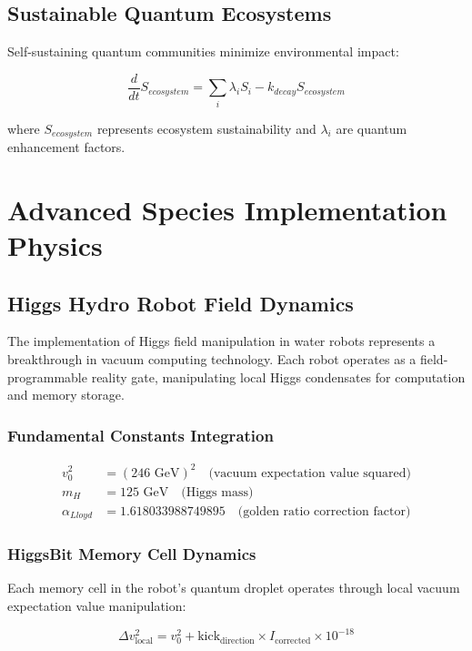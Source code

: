 \documentclass[11pt,a4paper]{article}
\begin{document}
\subsection{Sustainable Quantum Ecosystems}

Self-sustaining quantum communities minimize environmental impact:

\begin{equation}
\frac{d}{dt}S_{ecosystem} = \sum_i \lambda_i S_i - k_{decay} S_{ecosystem}
\end{equation}

where $S_{ecosystem}$ represents ecosystem sustainability and $\lambda_i$ are quantum enhancement factors.

\section{Advanced Species Implementation Physics}

\subsection{Higgs Hydro Robot Field Dynamics}

The implementation of Higgs field manipulation in water robots represents a breakthrough in vacuum computing technology. Each robot operates as a field-programmable reality gate, manipulating local Higgs condensates for computation and memory storage.

\subsubsection{Fundamental Constants Integration}
\begin{align}
v_0^2 &= (246 \text{ GeV})^2 \quad \text{(vacuum expectation value squared)}\\
m_H &= 125 \text{ GeV} \quad \text{(Higgs mass)}\\
\alpha_{Lloyd} &= 1.618033988749895 \quad \text{(golden ratio correction factor)}
\end{align}

\subsubsection{HiggsBit Memory Cell Dynamics}
Each memory cell in the robot's quantum droplet operates through local vacuum expectation value manipulation:

\begin{equation}
\Delta v^2_{\text{local}} = v_0^2 + \text{kick}_{\text{direction}} \times I_{\text{corrected}} \times 10^{-18}
\end{equation}
\end{document}
